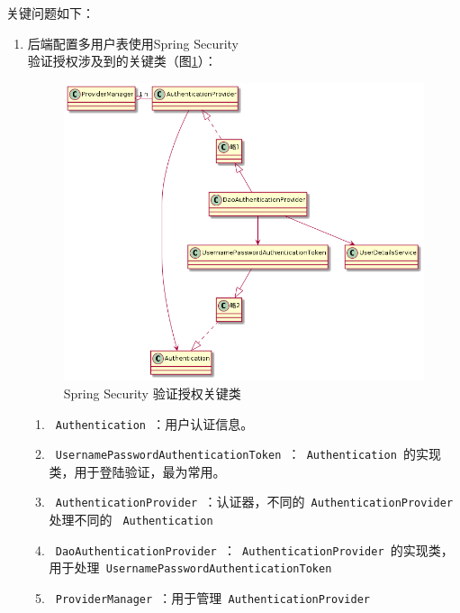 关键问题如下：
\begin{enumerate}
  \item 后端配置多用户表使用Spring Security\\
        验证授权涉及到的关键类（图\ref{SpringSecurity}）：
        \begin{figure}[H]
          \centering
          \includegraphics[scale = 0.5]{out/uml/类图/Spring Security/SpringSecurity验证/SpringSecurity验证.png}
          \caption{\song\wuhao Spring Security 验证授权关键类}
          \label{SpringSecurity}
        \end{figure}
        \begin{enumerate}
          \item \lstinline[language = Java]| Authentication |：用户认证信息。
          \item \lstinline[language = Java]| UsernamePasswordAuthenticationToken |：\lstinline[language = Java]| Authentication |的实现类，用于登陆验证，最为常用。
          \item \lstinline[language = Java]| AuthenticationProvider |：认证器，不同的\lstinline[language = Java]| AuthenticationProvider | 处理不同的 \lstinline[language = Java]| Authentication |
          \item \lstinline[language = Java]| DaoAuthenticationProvider |：\lstinline[language = Java]| AuthenticationProvider |的实现类，用于处理\lstinline[language = Java]| UsernamePasswordAuthenticationToken |
          \item \lstinline[language = Java]| ProviderManager |：用于管理\lstinline[language = Java]| AuthenticationProvider |

\end{enumerate}
\end{enumerate}

